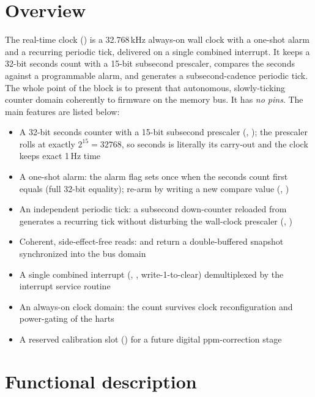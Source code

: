 \section{Overview}

The real-time clock () is a 32.768\,kHz always-on wall clock with a one-shot alarm and a recurring periodic tick, delivered on a single combined interrupt. It keeps a 32-bit seconds count with a 15-bit subsecond prescaler, compares the seconds against a programmable alarm, and generates a subsecond-cadence periodic tick. The whole point of the block is to present that autonomous, slowly-ticking counter domain coherently to firmware on the memory bus. It has \emph{no pins}. The main features are listed below:

\begin{itemize}
	\item A 32-bit seconds counter with a 15-bit subsecond prescaler (, ); the prescaler rolls at exactly $2^{15} = 32768$, so seconds is literally its carry-out and the clock keeps exact 1\,Hz time
	\item A one-shot alarm: the alarm flag sets once when the seconds count first equals  (full 32-bit equality); re-arm by writing a new compare value (, )
	\item An independent periodic tick: a subsecond down-counter reloaded from  generates a recurring tick without disturbing the wall-clock prescaler (, )
	\item Coherent, side-effect-free reads:  and  return a double-buffered snapshot synchronized into the bus domain
	\item A single combined interrupt (, , write-1-to-clear) demultiplexed by the interrupt service routine
	\item An always-on clock domain: the count survives clock reconfiguration and power-gating of the harts
	\item A reserved calibration slot () for a future digital ppm-correction stage
\end{itemize}

\section{Functional description}

